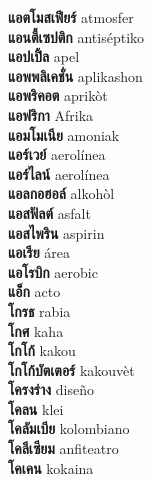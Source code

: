 \textbf{ แอตโมสเฟียร์  } atmosfer \\
\textbf{ แอนตี้เซปติก  } antiséptiko \\
\textbf{ แอปเปิ้ล  } apel \\
\textbf{ แอพพลิเคชั่น  } aplikashon \\
\textbf{ แอพริคอต  } aprikòt \\
\textbf{ แอฟริกา  } Afrika \\
\textbf{ แอมโมเนีย  } amoniak \\
\textbf{ แอร์เวย์  } aerolínea \\
\textbf{ แอร์ไลน์  } aerolínea \\
\textbf{ แอลกอฮอล์  } alkohòl \\
\textbf{ แอสฟัลต์  } asfalt \\
\textbf{ แอสไพริน  } aspirin \\
\textbf{ แอเรีย  } área \\
\textbf{ แอโรบิก  } aerobic \\
\textbf{ แอ็ก  } acto \\
\textbf{ โกรธ  } rabia \\
\textbf{ โกศ  } kaha \\
\textbf{ โกโก้  } kakou \\
\textbf{ โกโก้บัตเตอร์  } kakouvèt \\
\textbf{ โครงร่าง  } diseño \\
\textbf{ โคลน  } klei \\
\textbf{ โคลัมเบีย  } kolombiano \\
\textbf{ โคลีเซียม  } anfiteatro \\
\textbf{ โคเคน  } kokaina \\
